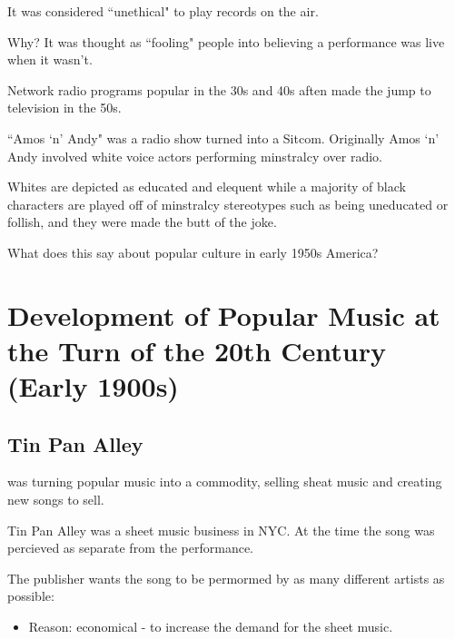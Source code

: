 \documentclass[12pt, a4paper, twoside, openright, titlepage]{book}
\begin{document}
\begin{rmk}{}{}
    It was considered ``unethical" to play records on the air.
    \begin{qst}{}{}
        Why? It was thought as ``fooling" people into believing a performance was live when it wasn't.
    \end{qst}
\end{rmk}

\begin{rmk}{}{}
    Network radio programs popular in the 30s and 40s aften made the jump to television in the 50s.
\end{rmk}
\begin{eg}{}{}
    ``Amos `n' Andy" was a radio show turned into a Sitcom. Originally Amos `n' Andy involved white voice actors performing minstralcy over radio.

    Whites are depicted as educated and elequent while a majority of black characters are played off of minstralcy stereotypes such as being uneducated or follish, and they were made the butt of the joke.
\end{eg}

\begin{qst}{}{}
    What does this say about popular culture in early 1950s America?
\end{qst}

\section{Development of Popular Music at the Turn of the 20th Century (Early 1900s)}


\subsection{Tin Pan Alley} 


\begin{rmk}{}{}
     was turning popular music into a commodity, selling sheat music and creating new songs to sell.
\end{rmk}


Tin Pan Alley was a sheet music business in NYC. At the time the song was percieved as separate from the performance.

The publisher wants the song to be permormed by as many different artists as possible:
\begin{itemize}
    \item Reason: economical - to increase the demand for the sheet music.
\end{itemize}
\end{document}
